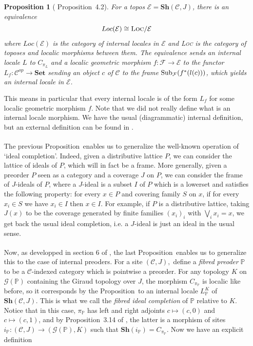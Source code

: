 \documentclass{article}
\newtheorem{proposition}[theorem]{Proposition}
\newcommand{\Set}{\mathbf{Set}}
\newcommand{\pcat}{\mathbb{P}}
\begin{document}
\begin{proposition}[\cite{caramello2022fibred} Proposition~4.2]\label{int_loc_eq}
    For a topos $\mathcal{E}=\mathbf{Sh}(\mathcal{C},J)$, there is an equivalence
$$Loc(\mathcal{E}) \cong \textsc{Loc}/\mathcal{E}$$
where $Loc(\mathcal{E})$ is the category of internal locales in $\mathcal{E}$ and \textsc{Loc} is the category of toposes and localic morphisms
between them. The equivalence sends an internal locale $L$ to $C_{\pi_L}$ and a localic geometric morphism $f: \mathcal{F} \xrightarrow{} \mathcal{E}$ to the functor $L_f: \mathcal{C}^{op} \xrightarrow{} \Set$ sending an object $c$ of $\mathcal{C}$ to the frame
$\textup{Sub}_\mathcal{F}(f^*(l(c)))$, which yields an internal locale in $\mathcal{E}$.
\end{proposition}

This means in particular that every internal locale is of the form $L_f$ for some localic geometric morphism $f$. Note that we did not really define what is an internal locale morphism. We have the usual (diagrammatic) internal definition, but an external definition can be found in \cite{wrigley2023some}. \\
\\
The previous Proposition~enables us to generalize the well-known operation of `ideal completion'. Indeed, given a distributive lattice $P$, we can consider the lattice of ideals of $P$, which will in fact be a frame. More generally, given a preorder $P$ seen as a category and a coverage $J$ on $P$, we can consider the frame of $J$-ideals of $P$, where a $J$-ideal is a subset $I$ of $P$ which is a lowerset and satisfies the following property: for every $x\in P$ and covering family $S$ on $x$, if for every $x_i\in S$ we have $x_i\in I$ then $x\in I$. For example, if $P$ is a distributive lattice, taking $J(x)$ to be the coverage generated by finite families $(x_i)_i$ with $\bigvee_i x_i=x$, we get back the usual ideal completion, i.e. a $J$-ideal is just an ideal in the usual sense. \\
\\
Now, as developped in section 6 of \cite{caramello2022fibred}, the last Proposition~enables us to generalize this to the case of internal preoders. For a site $(\mathcal{C},J),$ define a \emph{fibred preoder} $\pcat$ to be a $\mathcal{C}$-indexed category which is pointwise a preorder. For any topology $K$ on $\mathcal{G}(\pcat)$ containing the Giraud topology over $J$, the morphism $C_{\pi_\pcat}$ is localic like before, so it corresponds by the Proposition~to an internal locale $L_\pcat^K$ of $\mathbf{Sh}(\mathcal{C},J)$. This is what we call the \emph{fibred ideal completion} of $\pcat$ relative to $K$. Notice that in this case, $\pi_\pcat$ has left and right adjoints $c\mapsto (c,0)$ and $c\mapsto (c,1)$, and by Proposition~3.14 of \cite{caramello2019denseness}, the latter is a morphism of sites $i_\pcat:(\mathcal{C},J)\xrightarrow{}(\mathcal{G}(\pcat),K)$ such that $\mathbf{Sh}(i_\pcat)=C_{\pi_\pcat}$. Now we have an explicit definition
\end{document}
